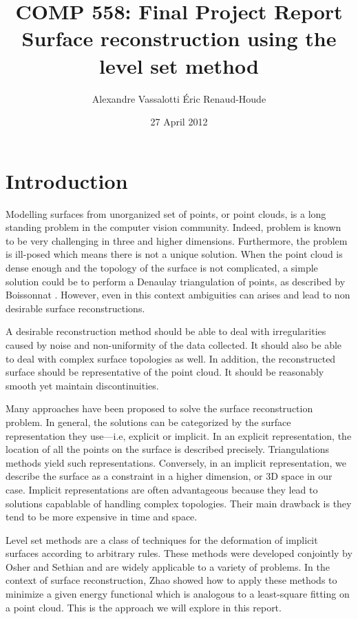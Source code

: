 \documentclass{article}
\author{Alexandre Vassalotti \quad \'{E}ric Renaud-Houde}
\title{COMP 558: Final Project Report \\
  \large \textbf{Surface reconstruction using the level set method}
}
\date{27 April 2012}
\begin{document}
\maketitle
\section{Introduction}
Modelling surfaces from unorganized set of points, or point clouds, is a long
standing problem in the computer vision community. Indeed, problem is known to
be very challenging in three and higher dimensions. Furthermore, the problem
is ill-posed which means there is not a unique solution. When the point cloud
is dense enough and the topology of the surface is not complicated, a simple
solution could be to perform a Denaulay triangulation of points, as
described by Boissonnat \cite{boissonnat1984geometric}. However, even in this
context ambiguities can arises and lead to non desirable surface
reconstructions.

A desirable reconstruction method should be able to deal with irregularities
caused by noise and non-uniformity of the data collected. It should also be
able to deal with complex surface topologies as well. In addition, the
reconstructed surface should be representative of the point cloud. It should
be reasonably smooth yet maintain discontinuities.

Many approaches have been proposed to solve the surface reconstruction
problem. In general, the solutions can be categorized by the surface
representation they use---i.e, explicit or implicit. In an explicit
representation, the location of all the points on the surface is described
precisely. Triangulations methods yield such representations. Conversely, in
an implicit representation, we describe the surface as a constraint in a
higher dimension, or 3D space in our case. Implicit representations are often
advantageous because they lead to solutions capablable of handling complex
topologies. Their main drawback is they tend to be more expensive in time and
space.

Level set methods are a class of techniques for the deformation of implicit
surfaces according to arbitrary rules. These methods were developed conjointly
by Osher and Sethian \cite{sethian1999level} and are widely applicable to a
variety of problems. In the context of surface reconstruction, Zhao showed
\cite{zhao2001fast} how to apply these methods to minimize a given energy
functional which is analogous to a least-square fitting on a point cloud. This
is the approach we will explore in this report.
\end{document}
